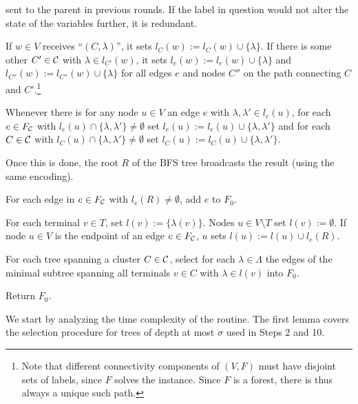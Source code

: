 \documentclass[letterpaper,11pt]{article}
\newcommand{\Comp}{\lambda}
\begin{document}
\begin{compactenum}
\begin{compactitem}
sent to the parent in previous rounds. If the label in question would not alter
the state of the variables further, it is redundant.
\item If $w\in V$ receives ``$(C,\Comp)$'', it sets
$l_C(w):=l_C(w)\cup\{\Comp\}$. If there is some other $C'\in {\cal C}$ with 
$\Comp\in l_{C'}(w)$, it sets $l_e(w):=l_e(w)\cup \{\Comp\}$ and
$l_{C''}(w):=l_{C''}(w)\cup \{\Comp\}$ for all edges $e$ and nodes $C''$ on the
path connecting $C$ and $C'$.\footnote{Note that different connectivity
components of $(V,F)$ must have disjoint sets of labels, since $F$ solves the
instance. Since $F$ is a forest, there is thus always a unique such path.}
\item Whenever there is for any node $u\in V$ an edge $e$ with
$\Comp,\Comp'\in l_e(u)$, for each $e\in F_{\cal C}$ with $l_e(u)\cap
\{\Comp,\Comp'\}\neq \emptyset$ set $l_e(u):=l_e(u)\cup \{\Comp,\Comp'\}$ and
for each $C\in {\cal C}$ with $l_C(u)\cap
\{\Comp,\Comp'\}\neq \emptyset$ set $l_C(u):=l_C(u)\cup \{\Comp,\Comp'\}$.
\end{compactitem}
\item Once this is done, the root $R$ of the BFS tree broadcasts the result
(using the same encoding).
\item For each edge in $e\in F_{\cal C}$ with $l_e(R)\neq \emptyset$, add $e$ to
$F_0$.
\item For each terminal $v\in T$, set $l(v):=\{\Comp(v)\}$. Nodes $u\in
V\setminus T$ set $l(v):=\emptyset$. If node $u\in V$ is the endpoint of an edge
$e\in F_{\cal C}$, $u$ sets $l(u):=l(u)\cup l_e(R)$.
\item For each tree spanning a cluster $C\in {\cal C}$, select for each
$\Comp\in \Lambda$ the edges of the minimal subtree spanning all terminals $v\in
C$ with $\Comp\in l(v)$ into $F_0$.
\item Return $F_0$.
\end{compactenum}

We start by analyzing the time complexity of the routine. The first lemma covers
the selection procedure for trees of depth at most $\sigma$ used in Steps 2 and
10.
\end{document}
